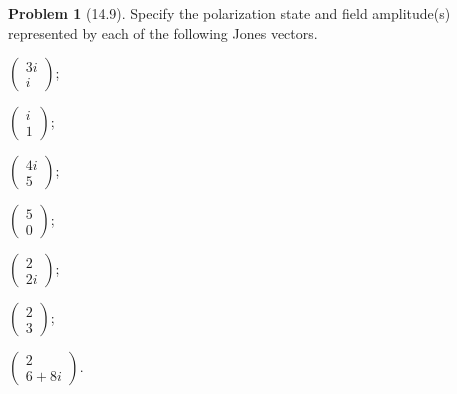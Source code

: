 \documentclass[10pt]{article}
\theoremstyle{definition}
\newtheorem{problem}{Problem}
\begin{document}
\begin{problem}[14.9]
Specify the polarization state and field amplitude(s) represented by each of the following Jones vectors.
\begin{center}
  \begin{enumerate*}[label=(\alph*)]
    \item $\begin{pmatrix}
              3i \\i
            \end{pmatrix}$;
    \item $\begin{pmatrix}
              i \\ 1
            \end{pmatrix}$;
    \item $\begin{pmatrix}
              4i \\ 5
            \end{pmatrix}$;
    \item $\begin{pmatrix}
              5 \\ 0
            \end{pmatrix}$;
    \item $\begin{pmatrix}
              2 \\ 2i
            \end{pmatrix}$;
    \item $\begin{pmatrix}
              2 \\ 3
            \end{pmatrix}$;
    \item $\begin{pmatrix}
              2 \\ 6+8i
            \end{pmatrix}$.
  \end{enumerate*}
\end{center}
\end{problem}
\end{document}
